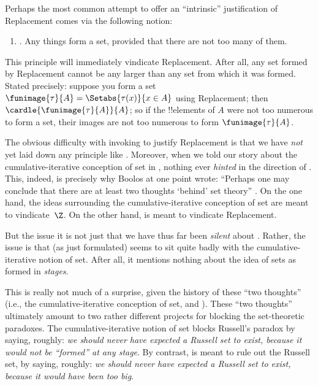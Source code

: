 \documentclass[../../../include/open-logic-section]{subfiles}
\begin{document}

Perhaps the most common attempt to offer an ``intrinsic'' justification of
Replacement comes via the following notion:
\begin{enumerate}
	\item[] \limofsize. Any things form a set, provided that there are
	not too many of them.
\end{enumerate}
This principle will immediately vindicate Replacement. After all, any
set formed by Replacement cannot be any larger than any set from which
it was formed. Stated precisely: suppose you form a set
$\funimage{\tau}{A} = \Setabs{\tau(x)}{x \in A}$ using Replacement;
then $\cardle{\funimage{\tau}{A}}{A}$; so if the !!{element}s of $A$
were not too numerous to form a set, their images are not too numerous
to form $\funimage{\tau}{A}$. 

The obvious difficulty with invoking \limofsize{} to justify
Replacement is that we have \emph{not} yet laid down any principle
like \limofsize. Moreover, when we told our story about the
cumulative-iterative conception of set in
, nothing ever \emph{hinted}
in the direction of \limofsize. This, indeed, is precisely why Boolos
at one point wrote: ``Perhaps one may conclude that there are at least
two thoughts `behind' set theory'' \citeyearpar[p.~19]{Boolos1989}. On
the one hand, the ideas surrounding the cumulative-iterative
conception of set are meant to vindicate~$\Z$. On the other hand,
\limofsize{} is meant to vindicate Replacement. 

But the issue it is not just that we have thus far been \emph{silent}
about \limofsize. Rather, the issue is that \limofsize{} (as just
formulated) seems to sit quite badly with the cumulative-iterative
notion of set. After all, it mentions nothing about the idea of sets
as formed in \emph{stages}.

This is really not much of a surprise, given the history of these
``two thoughts'' (i.e., the cumulative-iterative conception of set,
and \limofsize). These ``two thoughts'' ultimately amount to two
rather  different projects for blocking the set-theoretic paradoxes.
The cumulative-iterative notion of set blocks Russell's paradox by
saying, roughly: \emph{we should never have expected a Russell set to
exist, because it would not be ``formed'' at any stage}. By contrast,
\limofsize{} is meant to rule out the Russell set, by saying, roughly:
\emph{we should never have expected a Russell set to exist, because it
would have been too big}. 
\end{document}
